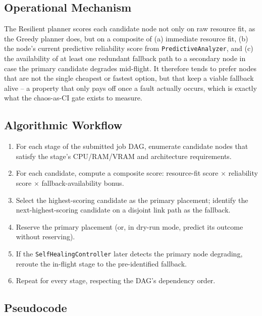 \documentclass[12pt,a4]{report}
\begin{document}
\subsection{Operational Mechanism}

The Resilient planner scores each candidate node not only on raw resource fit, as the Greedy planner does, but on a composite of (a) immediate resource fit, (b) the node's current predictive reliability score from \texttt{PredictiveAnalyzer}, and (c) the availability of at least one redundant fallback path to a secondary node in case the primary candidate degrades mid-flight. It therefore tends to prefer nodes that are not the single cheapest or fastest option, but that keep a viable fallback alive -- a property that only pays off once a fault actually occurs, which is exactly what the chaos-as-CI gate exists to measure.

\subsection{Algorithmic Workflow}

\begin{enumerate}
    \item For each stage of the submitted job DAG, enumerate candidate nodes that satisfy the stage's CPU/RAM/VRAM and architecture requirements.
    \item For each candidate, compute a composite score: resource-fit score $\times$ reliability score $\times$ fallback-availability bonus.
    \item Select the highest-scoring candidate as the primary placement; identify the next-highest-scoring candidate on a disjoint link path as the fallback.
    \item Reserve the primary placement (or, in dry-run mode, predict its outcome without reserving).
    \item If the \texttt{SelfHealingController} later detects the primary node degrading, reroute the in-flight stage to the pre-identified fallback.
    \item Repeat for every stage, respecting the DAG's dependency order.
\end{enumerate}

\subsection{Pseudocode}
\end{document}
